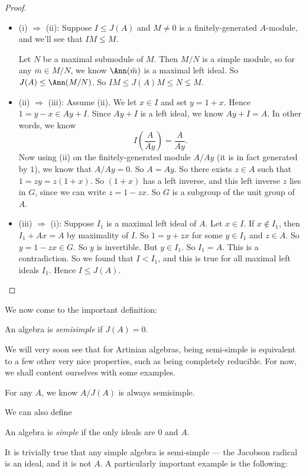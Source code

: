 \documentclass[a4paper]{article}
\begin{document}
\begin{proof}\leavevmode
  \begin{itemize}
    \item (i) $\Rightarrow$ (ii): Suppose $I \leq J(A)$ and $M \not= 0$ is a finitely-generated $A$-module, and we'll see that $IM \lneq M$.

      Let $N$ be a maximal submodule of $M$. Then $M/N$ is a simple module, so for any $\bar{m} \in M/N$, we know $\Ann(\bar{m})$ is a maximal left ideal. So $J(A) \leq \Ann(M/N)$. So $IM \leq J(A) M \leq N \lneq M$.
    \item (ii) $\Rightarrow$ (iii): Assume (ii). We let $x \in I$ and set $y = 1 + x$. Hence $1 = y - x \in Ay + I$. Since $Ay + I$ is a left ideal, we know $Ay + I = A$. In other words, we know
      \[
        I \left(\frac{A}{Ay}\right) = \frac{A}{Ay}.
      \]
      Now using (ii) on the finitely-generated module $A/Ay$ (it is in fact generated by $1$), we know that $A/Ay = 0$. So $A = Ay$. So there exists $z \in A$ such that $1 = zy = z(1 + x)$. So $(1 + x)$ has a left inverse, and this left inverse $z$ lies in $G$, since we can write $z = 1 - zx$. So $G$ is a subgroup of the unit group of $A$.

    \item (iii) $\Rightarrow$ (i): Suppose $I_1$ is a maximal left ideal of $A$. Let $x \in I$. If $x \not \in I_1$, then $I_1 + Ax = A$ by maximality of $I$. So $1 = y + zx$ for some $y \in I_1$ and $z \in A$. So $y = 1 - zx \in G$. So $y$ is invertible. But $y \in I_1$. So $I_1 = A$. This is a contradiction. So we found that $I < I_1$, and this is true for all maximal left ideals $I_1$. Hence $I \leq J(A)$.
  \end{itemize}
\end{proof}

We now come to the important definition:
\begin{defi}
  An algebra is \emph{semisimple} if $J(A) = 0$.
\end{defi}
We will very soon see that for Artinian algebras, being semi-simple is equivalent to a few other very nice properties, such as being completely reducible. For now, we shall content ourselves with some examples.

\begin{eg}
  For any $A$, we know $A/J(A)$ is always semisimple.
\end{eg}

We can also define
\begin{defi}
  An algebra is \emph{simple} if the only ideals are $0$ and $A$.
\end{defi}
It is trivially true that any simple algebra is semi-simple --- the Jacobson radical is an ideal, and it is not $A$. A particularly important example is the following:
\end{document}

